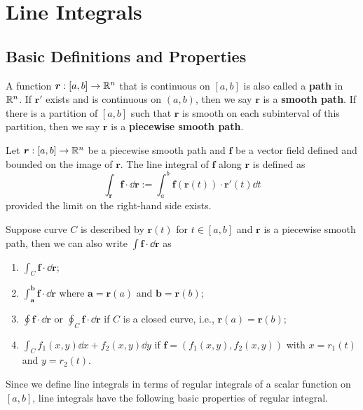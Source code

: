     \chapter{Line Integrals}
    \section{Basic Definitions and Properties}
    \begin{definitionenv}
        A function $\bm r : [a,b] \to \mathbb{R}^n$ that is continuous on $[a,b]$ is also called a \textbf{path} in $\mathbb{R}^n$. If $\bm r  '$ exists and is continuous on $(a,b)$, then we say $\bm r$ is a \textbf{smooth path}. If there is a partition of $[a,b]$ such that $\bm r$ is smooth on each subinterval of this partition, then we say $\bm r$ is a \textbf{piecewise smooth path}.
    \end{definitionenv}
    \begin{definitionenv}
        Let $\bm r:[a,b] \to \mathbb{R}^n$ be a piecewise smooth path and $\bm f$ be a vector field defined and bounded on the image of $\bm r$. The line integral of $\bm f$ along $\bm r$ is defined as
        $$ \int_{\bm r} \bm f \cdot \dd\bm r := \int_a^b \bm f(\bm r(t)) \cdot \bm r'(t) \dd t $$
        provided the limit on the right-hand side exists.
    \end{definitionenv}
    \begin{remarkenv}
        Suppose curve $C$ is described by $\bm r(t)$ for $t\in [a,b]$ and $\bm r$ is a piecewise smooth path, then we can also write $\displaystyle \int \bm f \cdot \dd \bm r$ as
        \begin{enumerate}
            \item $\displaystyle \int_C \bm f \cdot \dd \bm r$;
            \item $\displaystyle \int_{\bm a}^{\bm b} \bm f \cdot \dd \bm r$ where $\bm a = \bm r(a)$ and $\bm b = \bm r(b)$;
            \item $\displaystyle \oint \bm f \cdot \dd \bm r$ or $\displaystyle \oint_C \bm f \cdot \dd \bm r$ if $C$ is a closed curve, i.e., $\bm r(a) = \bm r(b)$;
            \item $\displaystyle \int_{C} f_1(x,y) \dd x + f_2(x,y) \dd y$ if $\bm f = (f_1(x,y), f_2(x,y))$ with $x=r_1(t)$ and $y=r_2(t)$.
        \end{enumerate}
    \end{remarkenv}
    \begin{remarkenv}
        Since we define line integrals in terms of regular integrals of a scalar function on $[a,b]$, line integrals have the following basic properties of regular integral.
    \end{remarkenv}

